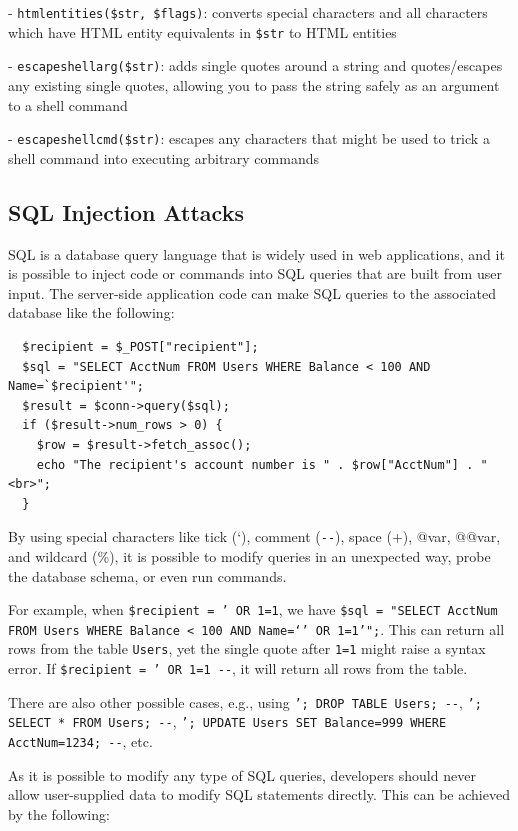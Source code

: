 - \texttt{htmlentities(\$str, \$flags)}: converts special characters and all characters which have HTML entity equivalents in \texttt{\$str} to HTML entities  

- \texttt{escapeshellarg(\$str)}: adds single quotes around a string and quotes/escapes any existing single quotes, allowing you to pass the string safely as an argument to a shell command  

- \texttt{escapeshellcmd(\$str)}: escapes any characters that might be used to trick a shell command into executing arbitrary commands  

\subsection{SQL Injection Attacks}
SQL is a database query language that is widely used in web applications, and it is possible to inject code or commands into SQL queries that are built from user input. The server-side application code can make SQL queries to the associated database like the following:

\begin{verbatim}
  $recipient = $_POST["recipient"];
  $sql = "SELECT AcctNum FROM Users WHERE Balance < 100 AND Name=`$recipient'";
  $result = $conn->query($sql);
  if ($result->num_rows > 0) {
    $row = $result->fetch_assoc();
    echo "The recipient's account number is " . $row["AcctNum"] . "<br>";
  }
\end{verbatim}

By using special characters like tick (`), comment (\texttt{-{}-}), space (+), @var, @@var, and wildcard (\%), it is possible to modify queries in an unexpected way, probe the database schema, or even run commands. 

For example, when \texttt{\$recipient = ' OR 1=1}, we have \texttt{\$sql = "SELECT AcctNum FROM Users WHERE Balance < 100 AND Name=`' OR 1=1'";}. This can return all rows from the table \texttt{Users}, yet the single quote after \texttt{1=1} might raise a syntax error. If \texttt{\$recipient = ' OR 1=1 -{}-}, it will return all rows from the table. 

There are also other possible cases, e.g., using \texttt{'; DROP TABLE Users; -{}-}, \texttt{'; SELECT * FROM Users; -{}-}, \texttt{'; UPDATE Users SET Balance=999 WHERE AcctNum=1234; -{}-}, etc. 

As it is possible to modify any type of SQL queries, developers should never allow user-supplied data to modify SQL statements directly. This can be achieved by the following: 

